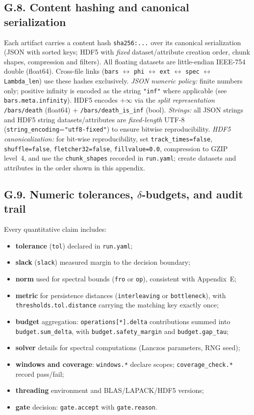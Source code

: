 \documentclass[11pt]{article}
\numberwithin{equation}{section}
\theoremstyle{plain}
\theoremstyle{definition}
\theoremstyle{remark}
\theoremstyle{plain}
\theoremstyle{definition}
\numberwithin{equation}{section}
\theoremstyle{definition}
\numberwithin{equation}{section}
\theoremstyle{plain}
\theoremstyle{definition}
\theoremstyle{remark}
\begin{document}
\subsection*{G.8. Content hashing and canonical serialization}
Each artifact carries a content hash \texttt{sha256:...} over its canonical serialization
(JSON with sorted keys; HDF5 with \emph{fixed} dataset/attribute creation order, chunk shapes,
compression and filters). All floating datasets are little-endian IEEE-754 double (float64).
Cross-file links (\texttt{bars} \(\leftrightarrow\) \texttt{phi} \(\leftrightarrow\) \texttt{ext} \(\leftrightarrow\) \texttt{spec} \(\leftrightarrow\) \texttt{Lambda\_len})
use these hashes exclusively.
\emph{JSON numeric policy:} finite numbers only; positive infinity is encoded as the string
\texttt{"inf"} where applicable (see \texttt{bars.meta.infinity}). HDF5 encodes \(+\infty\) via the
\emph{split representation} \texttt{/bars/death} (float64) + \texttt{/bars/death\_is\_inf} (bool).
\emph{Strings:} all JSON strings and HDF5 string datasets/attributes are \emph{fixed-length} UTF-8
(\texttt{string\_encoding}=\texttt{"utf8-fixed"}) to ensure bitwise reproducibility.
\emph{HDF5 canonicalization:} for bit-wise reproducibility, set \texttt{track\_times=false},
\texttt{shuffle=false}, \texttt{fletcher32=false}, \texttt{fillvalue=0.0}, compression to GZIP level~4,
and use the \texttt{chunk\_shapes} recorded in \texttt{run.yaml}; create datasets and attributes in the
order shown in this appendix.

\subsection*{G.9. Numeric tolerances, \(\delta\)-budgets, and audit trail}
Every quantitative claim includes:
\begin{itemize}[leftmargin=1.25em]
\item \textbf{tolerance} (\texttt{tol}) declared in \texttt{run.yaml};
\item \textbf{slack} (\texttt{slack}) measured margin to the decision boundary;
\item \textbf{norm} used for spectral bounds (\texttt{fro} or \texttt{op}), consistent with Appendix~E;
\item \textbf{metric} for persistence distances (\texttt{interleaving} or \texttt{bottleneck}),
with \texttt{thresholds.tol.distance} carrying the matching key exactly once;
\item \textbf{budget} aggregation: \texttt{operations[*].delta} contributions summed into
\texttt{budget.sum\_delta}, with \texttt{budget.safety\_margin} and \texttt{budget.gap\_tau};
\item \textbf{solver} details for spectral computations (Lanczos parameters, RNG seed);
\item \textbf{windows and coverage}: \texttt{windows.*} declare scopes; \texttt{coverage\_check.*} record pass/fail;
\item \textbf{threading} environment and BLAS/LAPACK/HDF5 versions;
\item \textbf{gate} decision: \texttt{gate.accept} with \texttt{gate.reason}.
\end{itemize}
\end{document}
